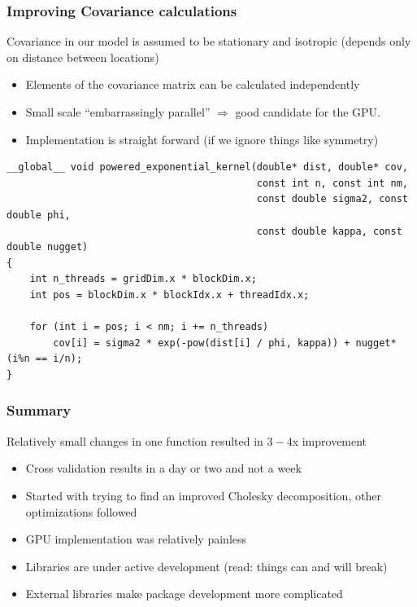 \documentclass{beamer}
\begin{document}
\begin{frame}[fragile]
\frametitle{Improving Covariance calculations}

Covariance in our model is assumed to be stationary and isotropic (depends only on distance between locations)
\begin{itemize}
\item Elements of the covariance matrix can be calculated independently
\item Small scale ``embarrassingly parallel'' $\Rightarrow$ good candidate for the GPU.
\item Implementation is straight forward (if we ignore things like symmetry)
\end{itemize}


\pause

\begin{block}{}
{\scriptsize
\begin{verbatim}
__global__ void powered_exponential_kernel(double* dist, double* cov,
                                           const int n, const int nm,
                                           const double sigma2, const double phi,
                                           const double kappa, const double nugget) 
{
    int n_threads = gridDim.x * blockDim.x;
    int pos = blockDim.x * blockIdx.x + threadIdx.x;

    for (int i = pos; i < nm; i += n_threads)
        cov[i] = sigma2 * exp(-pow(dist[i] / phi, kappa)) + nugget*(i%n == i/n);
}
\end{verbatim}
}
\end{block}

\end{frame}


\begin{frame}
\frametitle{Summary}

Relatively small changes in one function resulted in $3-4$x improvement
\begin{itemize}
\item Cross validation results in a day or two and not a week
\item Started with trying to find an improved Cholesky decomposition, other optimizations followed
\item GPU implementation was relatively painless
\item Libraries are under active development (read: things can and will break)
\item External libraries make package development more complicated
\end{itemize}

\end{frame}
\end{document}
